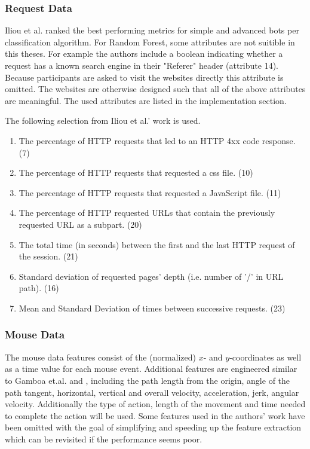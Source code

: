 \documentclass[
    fontsize=12pt,
    headings=small,
    parskip=half,           %
    bibliography=totoc,
    numbers=noenddot,       %
    open=any,               %
    final,                   %
    table
]{scrreprt}
\begin{document}
\label{concept_request_data}
\subsubsection{Request Data}

Iliou et al. \cite{10.1145/3339252.3339267} ranked the best performing metrics for simple and advanced bots per classification algorithm. For Random Forest, some attributes are not suitible in this theses. For example the authors include a boolean indicating whether a request has a known search engine in their "Referer" header (attribute 14). Because participants are asked to visit the websites directly this attribute is omitted. The websites are otherwise designed such that all of the above attributes are meaningful. The used attributes are listed in the implementation section.

The following selection from Iliou et al.' work \cite{10.1145/3339252.3339267} is used.

\begin{enumerate}
    \item The percentage of HTTP requests that led to an HTTP 4xx code response. (7)
    \item The percentage of HTTP requests that requested a css file. (10)
    \item The percentage of HTTP requests that requested a JavaScript file. (11)
    \item The percentage of HTTP requested URLs that contain the previously requested URL as a subpart. (20)
    \item The total time (in seconds) between the first and the last HTTP request of the session. (21)
    \item Standard deviation of requested pages' depth (i.e. number of ’/’ in URL path). (16)
    \item Mean and Standard Deviation of times between successive requests. (23)
\end{enumerate}

\label{concept_mouse_data}
\subsubsection{Mouse Data}

The mouse data features consist of the (normalized) $x$- and $y$-coordinates as well as a time value for each mouse event. Additional features are engineered similar to Gamboa et.al.\cite{GAMBOA2004} and \cite{https://doi.org/10.1049/iet-bmt.2018.5126}, including the path length from the origin, angle of the path tangent, horizontal, vertical and overall velocity, acceleration, jerk, angular velocity. Additionally the type of action, length of the movement and time needed to complete the action will be used. Some features used in the authors' work have been omitted with the goal of simplifying and speeding up the feature extraction which can be revisited if the performance seems poor.
\end{document}
